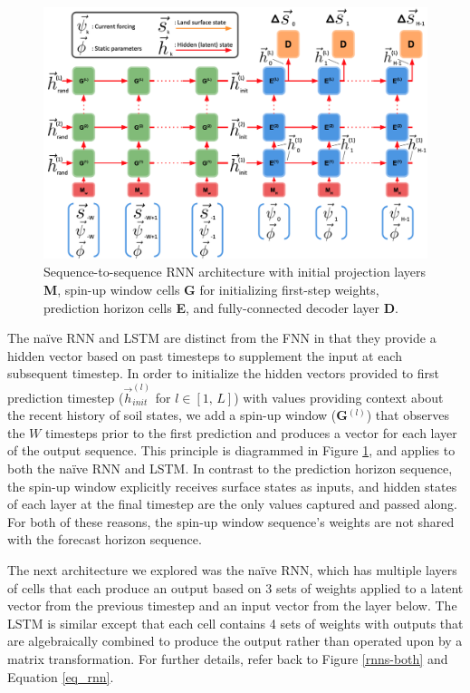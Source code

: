 \begin{figure}[h!]
    \centering
    \includegraphics[width=.95\linewidth]{figures/schematic_s2s-embed.png}

    \caption{Sequence-to-sequence RNN architecture with initial projection layers \textbf{M}, spin-up window cells \textbf{G} for initializing first-step weights, prediction horizon cells \textbf{E}, and fully-connected decoder layer \textbf{D}.}
    \label{s2s-default}
\end{figure}

The na\"ive RNN and LSTM are distinct from the FNN in that they provide a hidden vector based on past timesteps to supplement the input at each subsequent timestep. In order to initialize the hidden vectors provided to first prediction timestep ($\vec{h}^{(l)}_{init}$ for $l \in [1,\,L]$) with values providing context about the recent history of soil states, we add a spin-up window (\textbf{G}$^{(l)}$) that observes the $W$ timesteps prior to the first prediction and produces a vector for each layer of the output sequence. This principle is diagrammed in Figure \ref{s2s-default}, and applies to both the na\"ive RNN and LSTM. In contrast to the prediction horizon sequence, the spin-up window explicitly receives surface states as inputs, and hidden states of each layer at the final timestep are the only values captured and passed along. For both of these reasons, the spin-up window sequence's weights are not shared with the forecast horizon sequence.

The next architecture we explored was the na\"ive RNN, which has multiple layers of cells that each produce an output based on 3 sets of weights applied to a latent vector from the previous timestep and an input vector from the layer below. The LSTM is similar except that each cell contains 4 sets of weights with outputs that are algebraically combined to produce the output rather than operated upon by a matrix transformation. For further details, refer back to Figure \ref{rnns-both} and Equation \ref{eq_rnn}.

